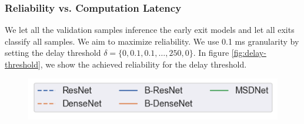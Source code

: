\newpage\subsubsection{Reliability vs. Computation Latency}

We let all the validation samples inference the early exit models and let all exits classify all samples.  We aim to maximize reliability. We use 0.1 ms granularity by setting the delay threshold $\delta = \{0,0.1,0.1, \dots, 250,0\}$. In figure \ref{fig:delay-threshold}, we show the achieved reliability for the delay threshold. 
\begin{figure}
	\captionsetup[subfigure]{justification=centering, farskip=0pt,captionskip=0pt}
	\centering
	\includegraphics[height=.05\textheight]{figures/delay_plots/delay_threshold_legend}
	\hfill
	\hfill
	\hfill

\end{figure}
